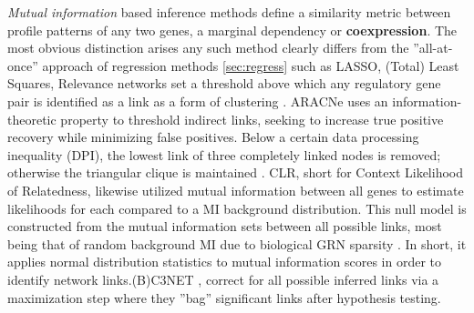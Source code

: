 \emph{Mutual information} based inference methods define a similarity metric between profile patterns of any two genes, a marginal dependency or \textbf{coexpression}. The most obvious distinction arises any such method clearly differs from the ''all-at-once'' approach of regression methods \cref{sec:regress} such as LASSO, (Total) Least Squares, \etc Relevance networks set a threshold above which any regulatory gene pair is identified as a link as a form of clustering \citep{faith2007large}. ARACNe uses an information-theoretic property to threshold indirect links, seeking to increase true positive recovery while minimizing false positives. Below a certain data processing inequality (DPI), the lowest link of three completely linked nodes is removed; otherwise the triangular clique is maintained \citep{montes2014aracne}. CLR, short for Context Likelihood of Relatedness, likewise utilized mutual information between all genes to estimate likelihoods for each compared to a MI background distribution. This null model is constructed from the mutual information sets between all possible links, most being that of random background MI due to biological GRN sparsity \citep{faith2007large}. In short, it applies normal distribution statistics to mutual information scores in order to identify network links.(B)C3NET \citep{altay2010inferring},\citep{de2012bagging} correct for all possible inferred links via a maximization step where they ''bag'' significant links after hypothesis testing.





